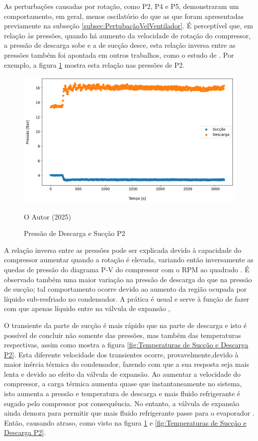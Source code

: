 As perturbações causadas por rotação, como P2, P4 e P5, demonstraram um comportamento, em geral, menos oscilatório do que as que foram apresentadas previamente na subseção \ref{subsec:PertubaçãoVelVentilador}. É perceptível que, em relação às pressões, quando há aumento da velocidade de rotação do compressor, a pressão de descarga sobe e a de sucção desce, esta relação inversa entre as pressões também foi apontada em outros trabalhos, como o estudo de \textcite{EffectsOFRefrigeranteCompressorAirFlow}. Por exemplo, a figura \ref{fig:Pressão de Descarga e Sucção P2} mostra esta relação nas pressões de P2. 
\newpage
\begin{figure}
    \centering
    \includegraphics[width=1\linewidth]{FigurasdoTexto/Pressão de Descarga e Sucção P2.png}
    \caption{Pressão de Descarga e Sucção P2}
    \label{fig:Pressão de Descarga e Sucção P2}
    {\footnotesize O Autor (2025)}
\end{figure}

A relação inversa entre as pressões pode ser explicada devido à capacidade do compressor aumentar quando a rotação é elevada, variando então inversamente as quedas de pressão do diagrama P-V do compressor com o RPM ao quadrado \cite{phillippi2008basic}.
É observado também uma maior variação na pressão de descarga do que na pressão de sucção; tal comportamento ocorre devido ao aumento da região ocupada por líquido sub-resfriado no condensador. A prática é usual e serve à função de fazer com que apenas líquido entre na válvula de expansão \cite{StoekerRefrigeration},

O transiente da parte de sucção é mais rápido que na parte de descarga e isto é possível de concluir não somente das pressões, mas também das temperaturas respectivas, assim como mostra a figura \ref{fig:Temperaturas de Sucção e Descarga P2}. Esta diferente velocidade dos transientes ocorre, provavelmente,devido à maior inércia térmica do condensador, fazendo com que a sua resposta seja mais lenta e devido ao efeito da válvula de expansão. Ao aumentar a velocidade do compressor, a carga térmica aumenta quase que instantaneamente no sistema, isto aumenta a pressão e temperatura de descarga e mais  fluido refrigerante é sugado pelo compressor por consequência. No entanto, a válvula de expansão ainda demora para permitir que mais fluido refrigerante passe para o evaporador \cite{CHEN20081368}. Então, causando atraso, como visto na figura \ref{fig:Pressão de Descarga e Sucção P2} e \ref{fig:Temperaturas de Sucção e Descarga P2}. 

